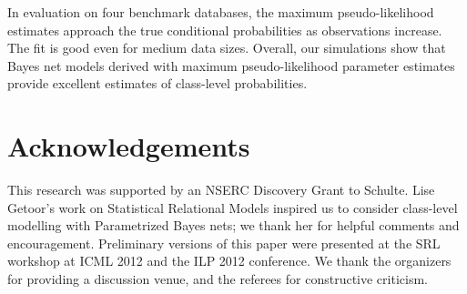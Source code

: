 \documentclass[oribibl]{llncs}
\begin{document}
In evaluation on four benchmark databases, the maximum pseudo-likelihood estimates approach the true conditional probabilities as observations increase. The fit is good even for medium data sizes. 
Overall, our simulations show that Bayes net models derived with maximum pseudo-likelihood parameter estimates provide excellent estimates of class-level probabilities.

\section*{Acknowledgements} This research was supported by an NSERC Discovery Grant to Schulte. Lise Getoor's work on Statistical Relational Models inspired us to consider class-level modelling with Parametrized Bayes nets; we thank her for helpful comments and encouragement. Preliminary versions of this paper were presented at the SRL workshop at ICML 2012 and the ILP 2012 conference. We thank the organizers for providing a discussion venue, and the referees for constructive criticism.
\end{document}
